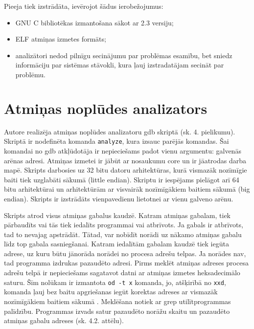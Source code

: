 Pieeja tiek izstrādāta, ievērojot šādus ierobežojumus: %
\begin{itemize}
	\item GNU C bibliotēkas izmantošana sākot ar 2.3 versiju;
    \item ELF atmiņas izmetes formāts;
    \item analizātori nedod pilnīgu secinājumu par problēmas esamību, bet sniedz informāciju par sistēmas stāvokli, kura ļauj izstradatājam secināt par problēmu.
\end{itemize}



\section{Atmiņas noplūdes analizators}
Autore realizēja atmiņas noplūdes analizatoru gdb skriptā (sk. 4. pielikumu). Skriptā ir nodefinēta komanda \texttt{analyze}, kura izsauc parējās komandas.
Šai komandai no gdb atkļūdotāja ir nepieciešams padot vienu argumentu: galvenās arēnas adresi.
Atmiņas izmetei ir jābūt ar nosaukumu core un ir jāatrodas darba mapē.
Skripts darbosies uz 32 bitu datoru arhitektūras, kurā vismazāk nozīmīgie baiti tiek uzglabāti sākumā (little endian).
Skriptu ir iespējams pielāgot arī 64 bitu arhitektūrai un arhitektūrām ar visvairāk nozīmīgākiem baitiem sākumā (big endian).
Skripts ir izstrādāts vienpavedienu lietotnei ar vienu galveno arēnu.

Skripts atrod visus atmiņas gabalus kaudzē. 
Katram atmiņas gabalam, tiek pārbaudīts vai tās tiek iedalīts programmai vai atbrīvots.
Ja gabals ir atbrīvots, tad to nevajag apstrādāt.
Tātad, var nobīdīt norādi uz nākamo atmiņas gabalu līdz top gabala sasniegšanai.
Katram iedalītām gabalam kaudzē tiek iegūta adrese, uz kuru būtu jānorāda norādei no procesa adrešu telpas.
Ja norādes nav, tad programma izdrukas pazaudēto adresi.
Pirms meklēt atmiņas adreses procesa adrešu telpā ir nepieciešams sagatavot datni ar atmiņas izmetes heksadecimālo saturu.
Šīm nolūkam ir izmantota \texttt{od -t x} komanda, jo, atšķirībā no \texttt{xxd}, komanda ļauj bez baitu apgriešanas iegūt korektas adreses ar  vismazāk nozīmīgākiem baitiem sākumā \cite{DPT}.
Meklēšana notiek ar grep utilītprogrammas palīdzību.
Programmas izvads satur pazaudēto norāžu skaitu un pazaudēto atmiņas gabalu adreses (sk. 4.2. attēlu).

